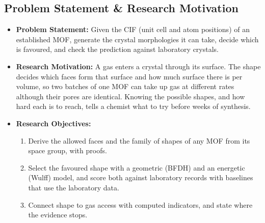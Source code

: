 \documentclass[11pt, a4paper]{article}
\begin{document}
\subsection{Problem Statement \& Research Motivation}
\begin{itemize}[noitemsep, topsep=2pt]
    \item \textbf{Problem Statement:} Given the CIF (unit cell and atom positions) of an established MOF, generate the crystal morphologies it can take, decide which is favoured, and check the prediction against laboratory crystals.
    \item \textbf{Research Motivation:} A gas enters a crystal through its surface. The shape decides which faces form that surface and how much surface there is per volume, so two batches of one MOF can take up gas at different rates although their pores are identical. Knowing the possible shapes, and how hard each is to reach, tells a chemist what to try before weeks of synthesis.
    \item \textbf{Research Objectives:}
    \begin{enumerate}[noitemsep, topsep=2pt]
        \item Derive the allowed faces and the family of shapes of any MOF from its space group, with proofs.
        \item Select the favoured shape with a geometric (BFDH) and an energetic (Wulff) model, and score both against laboratory records with baselines that use the laboratory data.
        \item Connect shape to gas access with computed indicators, and state where the evidence stops.
    \end{enumerate}
\end{itemize}
\end{document}
